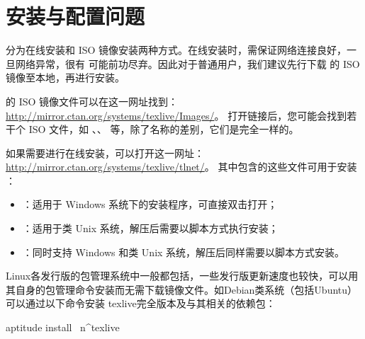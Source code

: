 %
%
%
%


\section{安装与配置问题}
\label{sec:install}


\TeXLive{} 分为在线安装和 ISO 镜像安装两种方式。在线安装时，需保证网络连接良好，一旦网络异常，很有
可能前功尽弃。因此对于普通用户，我们建议先行下载 \TeXLive{} 的 ISO 镜像至本地，再进行安装。

\TeXLive{} 的 ISO 镜像文件可以在这一网址找到：\url{http://mirror.ctan.org/systems/texlive/Images/}。
打开链接后，您可能会找到若干个 ISO 文件，如 、、
 等，除了名称的差别，它们是完全一样的。

如果需要进行在线安装，可以打开这一网址：\url{http://mirror.ctan.org/systems/texlive/tlnet/}。
其中包含的这些文件可用于安装 \TeXLive{}：

\begin{itemize}
  \item {}：适用于 Windows 系统下的安装程序，可直接双击打开；
  \item {}：适用于类 Unix 系统，解压后需要以脚本方式执行安装；
  \item {}：同时支持 Windows 和类 Unix 系统，解压后同样需要以脚本方式安装。
\end{itemize}

Linux各发行版的包管理系统中一般都包括\TeXLive{}，一些发行版更新速度也较快，可以用
其自身的包管理命令安装而无需下载镜像文件。如Debian类系统（包括Ubuntu）可以通过以下命令安装
texlive完全版本及与其相关的依赖包：
\begin{shcode}
  aptitude install ~n^texlive
\end{shcode}


